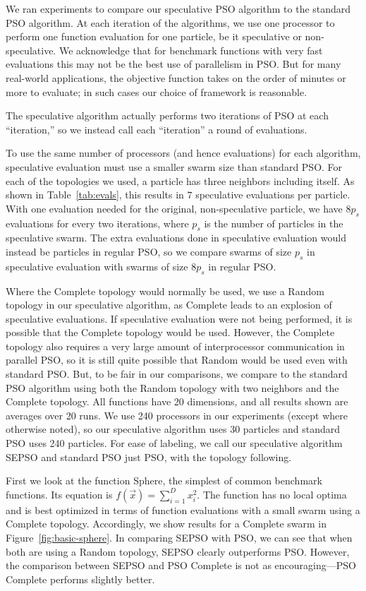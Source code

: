 \documentclass[journal,letterpaper]{IEEEtran}
\newcommand{\fig}[1]{Figure~\ref{fig:#1}}
\begin{document}
We ran experiments to compare our speculative PSO algorithm to the standard PSO
algorithm.  At each iteration of the algorithms, we use one processor to
perform one function evaluation for one particle, be it speculative or
non-speculative.  We acknowledge that for benchmark functions with very fast
evaluations this may not be the best use of parallelism in PSO.  But for many
real-world applications, the objective function takes on the order of minutes
or more to evaluate; in such cases our choice of framework is reasonable.

The speculative algorithm actually performs two iterations of PSO at each
``iteration,'' so we instead call each ``iteration'' a round of evaluations.

To use the same number of processors (and hence evaluations) for each
algorithm, speculative evaluation must use a smaller swarm size than standard
PSO.  For each of the topologies we used, a particle has three neighbors
including itself.  As shown in Table~\ref{tab:evals}, this results in $7$
speculative evaluations per particle.  With one evaluation needed for the
original, non-speculative particle, we have $8p_s$ evaluations for every two
iterations, where $p_s$ is the number of particles in the speculative swarm.
The extra evaluations done in speculative evaluation would instead be particles
in regular PSO, so we compare swarms of size $p_s$ in speculative evaluation
with swarms of size $8p_s$ in regular PSO.

Where the Complete topology would normally be used, we use a Random topology in
our speculative algorithm, as Complete leads to an explosion of speculative
evaluations.  If speculative evaluation were not being performed, it is
possible that the Complete topology would be used.  However, the Complete
topology also requires a very large amount of interprocessor communication in
parallel PSO, so it is still quite possible that Random would be used even with
standard PSO.  But, to be fair in our comparisons, we compare to the standard
PSO algorithm using both the Random topology with two neighbors and the
Complete topology.  All functions have 20 dimensions, and all results shown are
averages over 20 runs.  We use 240 processors in our experiments (except where
otherwise noted), so our speculative algorithm uses 30 particles and standard
PSO uses 240 particles.  For ease of labeling, we call our speculative
algorithm SEPSO and standard PSO just PSO, with the topology following.

First we look at the function Sphere, the simplest of common benchmark
functions.  Its equation is $f(\Vec{x}) = \sum_{i=1}^D x_i^2$.  The function
has no local optima and is best optimized in terms of function evaluations with
a small swarm using a Complete topology.  Accordingly, we show results for a
Complete swarm in \fig{basic-sphere}.  In comparing SEPSO with PSO, we can see
that when both are using a Random topology, SEPSO clearly outperforms PSO.
However, the comparison between SEPSO and PSO Complete is not as
encouraging---PSO Complete performs slightly better.
\end{document}
